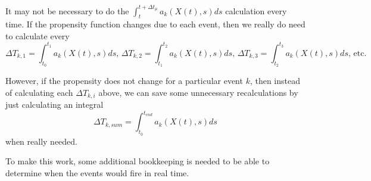 \documentclass[a4paper,11pt]{article}
\begin{document}
			It may not be necessary to do the $\int_t^{t+\Delta t_\mu} a_k(X(t),s) ds$ calculation every time.
			If the propensity function changes due to each event, then we really do need to calculate every
			\[ \Delta T_{k,1} = \int_{t_0}^{t_1} a_k(X(t),s) ds \textrm{, }
			   \Delta T_{k,2} = \int_{t_1}^{t_2} a_k(X(t),s) ds \textrm{, }
			   \Delta T_{k,3} = \int_{t_2}^{t_3} a_k(X(t),s) ds \textrm{, etc.} \]
			
			However, if the propensity does not change for a particular event $k$, then instead of calculating
			each $\Delta T_{k,i}$ above, we can save some unnecessary recalculations by just calculating an
			integral 
			\[ \Delta T_{k,sum} = \int_{t_0}^{t_{end}} a_k(X(t),s) ds \]
			when really needed.
	
			To make this work, some additional bookkeeping is needed to be able to determine when the events
			would fire in real time.
	
\end{document}
